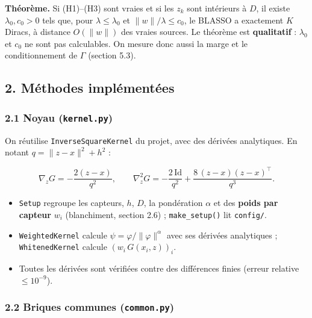 \documentclass[
  french,
]{article}
\providecommand{\tightlist}{%
  \setlength{\itemsep}{0pt}\setlength{\parskip}{0pt}}
\begin{document}
\textbf{Théorème.} Si (H1)--(H3) sont vraies et si les \(z_k\) sont
intérieurs à \(D\), il existe \(\lambda_0, c_0 > 0\) tels que, pour
\(\lambda\le\lambda_0\) et \(\lVert w\rVert/\lambda\le c_0\), le BLASSO
a exactement \(K\) Diracs, à distance \(O(\lVert w\rVert)\) des vraies
sources. Le théorème est \textbf{qualitatif} : \(\lambda_0\) et \(c_0\)
ne sont pas calculables. On mesure donc aussi la marge et le
conditionnement de \(\Gamma\) (section 5.3).

\subsection{2. Méthodes
implémentées}\label{muxe9thodes-impluxe9mentuxe9es}

\subsubsection{\texorpdfstring{2.1 Noyau
(\texttt{kernel.py})}{2.1 Noyau (kernel.py)}}\label{noyau-kernel.py}

On réutilise \texttt{InverseSquareKernel} du projet, avec des dérivées
analytiques. En notant \(q = \lVert z-x\rVert^2 + h^2\) :

\[
\nabla_z G = -\frac{2(z-x)}{q^2},
\qquad
\nabla_z^2 G = -\frac{2\,\mathrm{Id}}{q^2} + \frac{8\,(z-x)(z-x)^{\top}}{q^3}.
\]

\begin{itemize}
\tightlist
\item
  \texttt{Setup} regroupe les capteurs, \(h\), \(D\), la pondération
  \(\alpha\) et des \textbf{poids par capteur} \(w_i\) (blanchiment,
  section 2.6) ; \texttt{make\_setup()} lit \texttt{config/}.
\item
  \texttt{WeightedKernel} calcule
  \(\psi = \varphi/\lVert\varphi\rVert^{\alpha}\) avec ses dérivées
  analytiques ; \texttt{WhitenedKernel} calcule \((w_i\,G(x_i,z))_i\).
\item
  Toutes les dérivées sont vérifiées contre des différences finies
  (erreur relative \(\le 10^{-9}\)).
\end{itemize}

\subsubsection{\texorpdfstring{2.2 Briques communes
(\texttt{common.py})}{2.2 Briques communes (common.py)}}\label{briques-communes-common.py}
\end{document}
